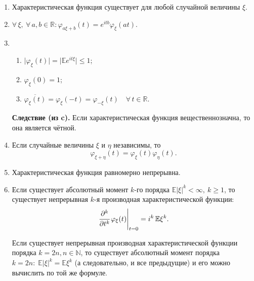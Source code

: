 \begin{namedthm}\leavevmode
    \begin{enumerate}
        \item 
            Характеристическая функция существует для любой случайной величины $\xi$.
        \item 
            $\forall \, \xi,~ \forall \, a, b \in \mathbb{R} \colon \varphi_{a \xi + b}(t) = e^{itb} \varphi_{\xi}(at)$.
        \item 
            \begin{enumerate}
                \item $ \bigl| \varphi_{\xi}(t) \bigr| = \bigl| \mathbb{E} e^{i t \xi} \bigr| \leqslant 1 $;
                \item $ \varphi_{\xi}(0) = 1 $;
                \item $ \overline{\varphi_{\xi}(t)} = \varphi_{\xi}(-t) = \varphi_{-\xi}(t) \quad \forall \, t \in \mathbb{R}$.
            \end{enumerate}
            \textbf{Следствие (из c).}
                Если характеристическая функция вещественнозначна, то она является чётной.
        
        \item 
            Если случайные величины $\xi$ и $\eta$ независимы, то
            \begin{equation*}
                \varphi_{\xi + \eta}(t) = \varphi_{\xi}(t) \varphi_{\eta}(t).
            \end{equation*}
        \item 
            Характеристическая функция равномерно непрерывна.
        \item 
            Если существует абсолютный момент $k$-го порядка $\mathbb{E}|\xi|^{k} < \infty,~ k \geqslant 1$, 
            то существует непрерывная $k$-я производная характеристической функции:
            \begin{equation*}
                \left.\cfrac{\partial^{k}}{\partial t^{k}} \, \varphi_{\xi}(t)\right|_{t=0}= i^{k} \, \mathbb{E} \xi^{k}.
            \end{equation*}
            
            Если существует непрерывная производная характеристической функции порядка $k = 2n, n \in \mathbb{N}$, 
            то существует абсолютный момент порядка $k = 2n: \; \mathbb{E}|\xi|^k = \mathbb{E}\xi^k$ (а следовательно, и все предыдущие) 
            и его можно вычислить по той же формуле.
        

\end{enumerate}
\end{namedthm}
